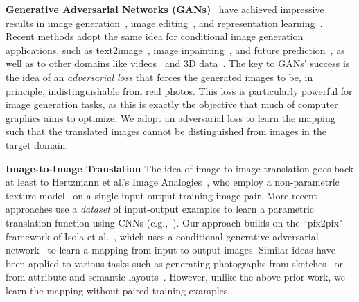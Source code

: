\documentclass[10pt,twocolumn,letterpaper]{article}
\begin{document}
{\bf Generative Adversarial Networks  (GANs)}~\cite{goodfellow2014generative,zhao2016energy} have achieved impressive results in image generation~\cite{denton2015deep,radford2015unsupervised}, image editing~\cite{zhu2016generative}, and representation learning~\cite{radford2015unsupervised,salimans2016improved,mathieu2016disentangling}.　
Recent methods adopt the same idea for conditional image generation applications, such as text2image~\cite{reed2016generative}, image inpainting~\cite{pathak2016context}, and future prediction~\cite{mathieu2015deep}, as well as to other domains like videos~\cite{vondrick2016generating} and 3D data~\cite{wu2016learning}. 
The key to GANs' success is the idea of an \textit{adversarial loss} that forces the generated images to be, in principle, indistinguishable from real photos.  
This loss is particularly powerful for image generation tasks,  
as this is exactly the objective that much of computer graphics aims to optimize.  We adopt an adversarial loss to learn the mapping such that the translated images cannot be distinguished from images in the target domain.

{\bf Image-to-Image Translation}
The idea of image-to-image translation goes back at least to Hertzmann et al.'s Image Analogies~\cite{hertzmann2001image}, who employ a non-parametric texture model~\cite{efros1999texture} on a single input-output training image pair.
More recent approaches use a \emph{dataset} of input-output examples to learn a parametric translation function using CNNs (e.g.,~\cite{long2015fully}). Our approach builds on the ``pix2pix" framework of Isola et al.~\cite{isola2016image}, which uses a conditional generative adversarial network~\cite{goodfellow2014generative} to learn a mapping from input to output images. Similar ideas have been applied to various tasks such as generating photographs from sketches~\cite{sangkloy2016scribbler} or from attribute and semantic layouts~\cite{karacan2016learning}. However, unlike the above prior work, we learn the mapping without paired training examples. 
\end{document}
